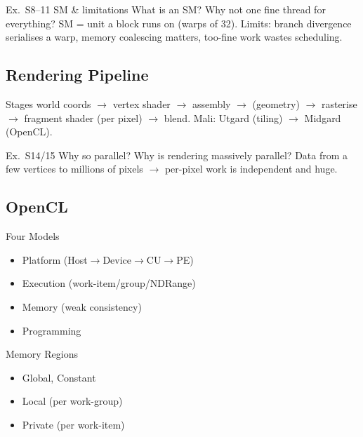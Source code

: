 \begin{example2}{Ex.\ S8--11 SM \& limitations}
    What is an SM? Why not one fine thread for everything?
    \tcblower
    SM = unit a block runs on (warps of 32). Limits: branch divergence serialises a warp, memory coalescing matters, too-fine work wastes scheduling.
\end{example2}

\subsection{Rendering Pipeline}

\begin{concept}{Stages}
    world coords $\to$ vertex shader $\to$ assembly $\to$ (geometry) $\to$ rasterise $\to$ fragment shader (per pixel) $\to$ blend. Mali: Utgard (tiling) $\to$ Midgard (OpenCL).
\end{concept}

\begin{example2}{Ex.\ S14/15 Why so parallel?}
    Why is rendering massively parallel?
    \tcblower
    Data  from a few vertices to millions of pixels $\to$ per-pixel work is independent and huge.
\end{example2}

\subsection{OpenCL}


\begin{definition}{Four Models}
    \begin{itemize}
        \item Platform (Host$\to$Device$\to$CU$\to$PE)
        \item Execution (work-item/group/NDRange)
        \item Memory (weak consistency)
        \item Programming
    \end{itemize}
\end{definition}

\begin{definition}{Memory Regions}
    \begin{itemize}
        \item Global, Constant
        \item Local (per work-group)
        \item Private (per work-item)
    \end{itemize}
\end{definition}

